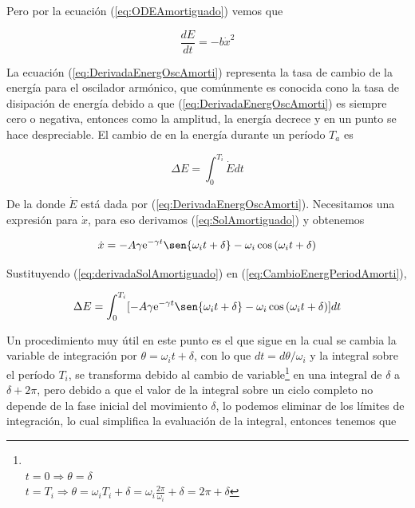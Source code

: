 \documentclass[a4paper,10pt]{article}
\numberwithin{equation}{section}
\newcommand{\euler}{\mathrm{e}}
\begin{document}
Pero por la ecuación (\ref{eq:ODEAmortiguado}) vemos que

\begin{equation}
\frac{dE}{dt} = - b \dot{x}^2
\label{eq:DerivadaEnergOscAmorti}
\end{equation}

La ecuación (\ref{eq:DerivadaEnergOscAmorti}) representa la tasa de cambio de la
energía para el oscilador armónico, que comúnmente es conocida cono la tasa de 
disipación de energía debido a que (\ref{eq:DerivadaEnergOscAmorti})
es siempre cero o negativa, entonces como la amplitud, la energía decrece
y en un punto se hace despreciable. El cambio de en la energía durante un período
$T_a$ es 

\begin{equation}
 \Delta E = \int_0^{T_i} \dot{E} dt
 \label{eq:CambioEnergPeriodAmorti}
\end{equation}

De la donde $\dot{E}$ está dada por (\ref{eq:DerivadaEnergOscAmorti}). Necesitamos
una expresión para $\dot{x}$, para eso derivamos (\ref{eq:SolAmortiguado}) y obtenemos

\begin{equation}
 \dot{x} = - A\gamma \euler^{-\gamma t} \sen{\omega_i t + \delta} - \omega_i \cos{(\omega_i t + \delta)}
 \label{eq:derivadaSolAmortiguado}
\end{equation}

Sustituyendo (\ref{eq:derivadaSolAmortiguado}) en (\ref{eq:CambioEnergPeriodAmorti}),

\begin{equation}
 \Delta E = \int_0^{T_i} [- A\gamma \euler^{-\gamma t} \sen{\omega_i t + \delta} - \omega_i \cos{(\omega_i t + \delta)}] dt
\end{equation}

Un procedimiento muy útil en este punto es el que sigue \cite{fowles} en la cual
se cambia la variable de integración por $\theta = \omega_i t + \delta$, con lo que
$dt = d\theta / \omega_i$ y la integral sobre el período $T_i$, se transforma debido
al cambio de variable\footnote{\\$
 t = 0 \Rightarrow \theta = \delta 
 $ \\
 $t = T_i \Rightarrow \theta = \omega_i T_i + \delta = \omega_i \frac{2\pi}{\omega_i} + \delta = 2\pi + \delta
 $} en una integral de $\delta$ a $\delta + 2\pi$, pero debido a que el valor de la 
integral sobre un ciclo completo no depende de la fase inicial del movimiento $\delta$,
lo podemos eliminar de los límites de integración, lo cual simplifica la evaluación
de la integral, entonces tenemos que
\end{document}
